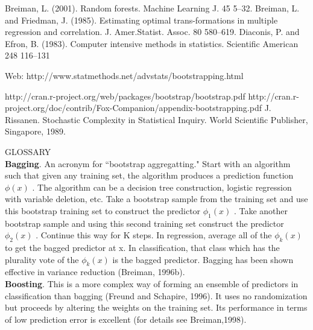 \documentclass[journal]{/home/hoofar/LatexClasses/IEEEtran}
\begin{document}
\begin{thebibliography}{1}
%
Breiman, L. (2001). Random forests. Machine Learning J. 45 5–32.
Breiman, L. and Friedman, J. (1985). Estimating optimal trans-formations in multiple regression and correlation. J. Amer.Statist. Assoc. 80 580–619.
Diaconis, P. and Efron, B. (1983). Computer intensive methods
in statistics. Scientific American 248 116–131

Web: http://www.statmethods.net/advstats/bootstrapping.html
  
http://cran.r-project.org/web/packages/bootstrap/bootstrap.pdf
http://cran.r-project.org/doc/contrib/Fox-Companion/appendix-bootstrapping.pdf
 J. Rissanen. Stochastic Complexity in Statistical Inquiry.
World Scientific Publisher, Singapore, 1989.

\end{thebibliography}


\begin{IEEEbiographynophoto}{GLOSSARY}
\newline
 \\
 \textbf{Bagging}. An acronym for ``bootstrap aggregatting." Start with an algorithm such that given any
training set, the algorithm produces a prediction
function $\phi(x)$ . The algorithm can be a decision tree
construction, logistic regression with variable deletion, etc. Take a bootstrap sample from the training
set and use this bootstrap training set to construct
the predictor $\phi_{1}(x)$ . Take another bootstrap sample and using this second training set construct the
predictor $\phi_{2}(x)$ . Continue this way for K steps. In
regression, average all of the $\phi_{k}(x)$ to get the
bagged predictor at x. In classification, that class
which has the plurality vote of the $\phi_{k}(x)$ is the
bagged predictor. Bagging has been shown effective
in variance reduction (Breiman, 1996b).\\

\textbf{Boosting}. This is a more complex way of forming
an ensemble of predictors in classification than bagging (Freund and Schapire, 1996). It uses no randomization but proceeds by altering the weights on
the training set. Its performance in terms of low prediction error is excellent (for details see Breiman,1998).


\end{IEEEbiographynophoto}
\end{document}

